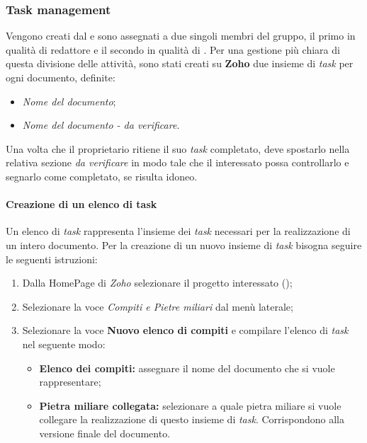 \subsubsection{Task management}
Vengono creati dal \textsl{\RdP} e sono assegnati a due singoli membri del gruppo, 
il primo in qualità di redattore e il secondo in qualità di \textit{\Ver}.
Per una gestione più chiara di questa divisione delle attività, sono stati creati su \textbf{Zoho} 
due insieme di \textit{task} per ogni documento, definite:
\begin{itemize}
  \item \textsl{Nome del documento};
  \item \textsl{Nome del documento - da verificare}.
\end{itemize}
Una volta che il proprietario ritiene il suo \textit{task} completato, deve spostarlo 
nella relativa sezione \textsl{da verificare} in modo tale che il \textit{\Ver} 
interessato possa controllarlo e segnarlo come completato, se risulta idoneo. 

\paragraph{Creazione di un elenco di task}
Un elenco di \textit{task} rappresenta l'insieme dei \textit{task} necessari per la realizzazione di un intero documento.
Per la creazione di un nuovo insieme di \textit{task} bisogna seguire le seguenti istruzioni:
\begin{enumerate}
   \item Dalla HomePage di \textit{Zoho} selezionare il progetto interessato (\progetto);
  \item Selezionare la voce \textsl{Compiti e Pietre miliari} dal menù laterale;
   \item Selezionare la voce \textbf{Nuovo elenco di compiti} e compilare l'elenco di \textit{task} nel 
  seguente modo:
  \begin{itemize}
    \item \textbf{Elenco dei compiti:} assegnare il nome del documento che si 
    vuole rappresentare;
    \item \textbf{Pietra miliare collegata:} selezionare a quale pietra miliare si 
    vuole collegare la realizzazione di questo insieme di \textit{task}. Corrispondono alla 
    versione finale del documento.
  \end{itemize}
\end{enumerate}

